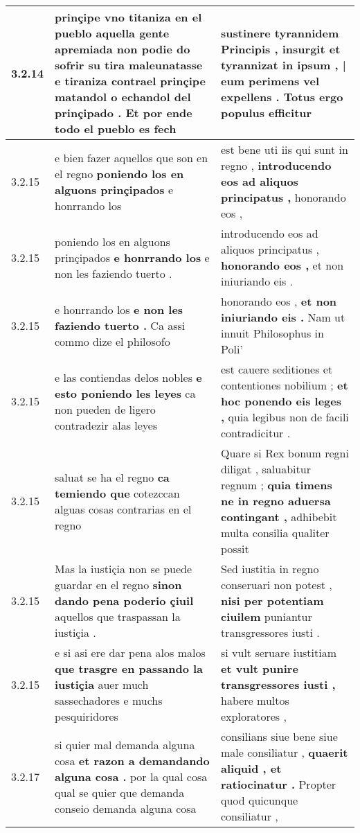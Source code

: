 \begin{tabular}{|p{1cm}|p{6.5cm}|p{6.5cm}|}
3.2.14 & prinçipe vno titaniza en el pueblo aquella gente apremiada non podie do sofrir su tira \textbf{ maleunatasse e tiraniza contrael prinçipe matandol o echandol del prinçipado . } Et por ende todo el pueblo es fech & sustinere tyrannidem Principis , \textbf{ insurgit et tyrannizat in ipsum , | eum perimens vel expellens . } Totus ergo populus efficitur \\\hline
3.2.15 & e bien fazer aquellos que son en el regno \textbf{ poniendo los en alguons prinçipados } e honrrando los & est bene uti iis qui sunt in regno , \textbf{ introducendo eos ad aliquos principatus , } honorando eos , \\\hline
3.2.15 & poniendo los en alguons prinçipados \textbf{ e honrrando los } e non les faziendo tuerto . & introducendo eos ad aliquos principatus , \textbf{ honorando eos , } et non iniuriando eis . \\\hline
3.2.15 & e honrrando los \textbf{ e non les faziendo tuerto . } Ca assi commo dize el philosofo & honorando eos , \textbf{ et non iniuriando eis . } Nam ut innuit Philosophus in Poli’ \\\hline
3.2.15 & e las contiendas delos nobles \textbf{ e esto poniendo les leyes } ca non pueden de ligero contradezir alas leyes & est cauere seditiones et contentiones nobilium ; \textbf{ et hoc ponendo eis leges , } quia legibus non de facili contradicitur . \\\hline
3.2.15 & saluat se ha el regno \textbf{ ca temiendo que } cotezccan alguas cosas contrarias en el regno & Quare si Rex bonum regni diligat , saluabitur regnum ; \textbf{ quia timens ne in regno aduersa contingant , } adhibebit multa consilia qualiter possit \\\hline
3.2.15 & Mas la iustiçia non se puede guardar en el regno \textbf{ sinon dando pena poderio çiuil } aquellos que traspassan la iustiçia . & Sed iustitia in regno conseruari non potest , \textbf{ nisi per potentiam ciuilem } puniantur transgressores iusti . \\\hline
3.2.15 & e si asi ere dar pena alos malos \textbf{ que trasgre en passando la iustiçia } auer much sassechadores e muchs pesquiridores & si vult seruare iustitiam \textbf{ et vult punire transgressores iusti , } habere multos exploratores , \\\hline
3.2.17 & si quier mal demanda alguna cosa \textbf{ et razon a demandando alguna cosa . } por la qual cosa qual se quier que demanda conseio demanda alguna cosa & consilians siue bene siue male consiliatur , \textbf{ quaerit aliquid , et ratiocinatur . } Propter quod quicunque consiliatur , \\\hline

\end{tabular}
